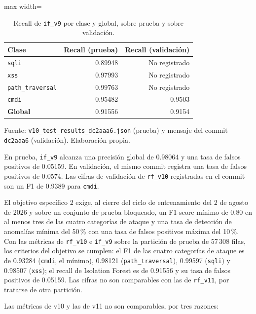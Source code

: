 \begin{table}[htbp]
\centering
\footnotesize
\begin{adjustbox}{max width=\linewidth}
\begin{tabular}{|l|r|r|}
\hline
\textbf{Clase} & \textbf{Recall (prueba)} & \textbf{Recall (validación)} \\ \hline
\texttt{sqli} & 0.89948 & No registrado \\ \hline
\texttt{xss} & 0.97993 & No registrado \\ \hline
\texttt{path\_traversal} & 0.99763 & No registrado \\ \hline
\texttt{cmdi} & 0.95482 & 0.9503 \\ \hline
\textbf{Global} & 0.91556 & 0.9154 \\ \hline
\end{tabular}
\end{adjustbox}
\caption{Recall de \texttt{if\_v9} por clase y global, sobre prueba y sobre validación.}
\label{tabla:anexo-v10-if}
\par\smallskip\footnotesize Fuente: \texttt{v10\_test\_results\_dc2aaa6.json} (prueba) y mensaje del commit \texttt{dc2aaa6} (validación). Elaboración propia.
\end{table}

En prueba, \texttt{if\_v9} alcanza una precisión global de 0.98064 y una tasa de falsos positivos de 0.05159. En validación, el mismo commit registra una tasa de falsos positivos de 0.0574. Las cifras de validación de \texttt{rf\_v10} registradas en el commit son un F1 de 0.9389 para \texttt{cmdi}.

El objetivo específico 2 exige, al cierre del ciclo de entrenamiento del 2 de agosto de 2026 y sobre un conjunto de prueba bloqueado, un F1-score mínimo de 0.80 en al menos tres de las cuatro categorías de ataque y una tasa de detección de anomalías mínima del 50\,\% con una tasa de falsos positivos máxima del 10\,\%. Con las métricas de \texttt{rf\_v10} e \texttt{if\_v9} sobre la partición de prueba de 57\,308 filas, los criterios del objetivo se cumplen: el F1 de las cuatro categorías de ataque es de 0.93284 (\texttt{cmdi}, el mínimo), 0.98121 (\texttt{path\_traversal}), 0.99597 (\texttt{sqli}) y 0.98507 (\texttt{xss}); el recall de Isolation Forest es de 0.91556 y su tasa de falsos positivos de 0.05159. Las cifras no son comparables con las de \texttt{rf\_v11}, por tratarse de otra partición.

Las métricas de v10 y las de v11 no son comparables, por tres razones:

